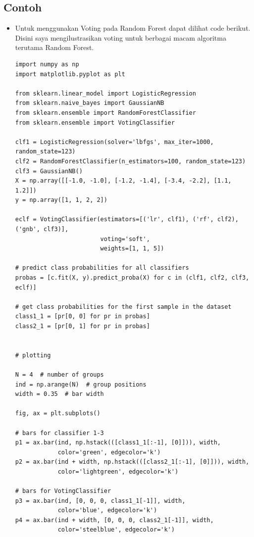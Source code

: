 \subsection{Contoh}
\begin{itemize}
\item
Untuk menggunakan Voting pada Random Forest dapat dilihat code berikut. Disini saya mengilustrasikan voting untuk berbagai macam algoritma terutama Random Forest.
\begin{verbatim}
import numpy as np
import matplotlib.pyplot as plt

from sklearn.linear_model import LogisticRegression
from sklearn.naive_bayes import GaussianNB
from sklearn.ensemble import RandomForestClassifier
from sklearn.ensemble import VotingClassifier

clf1 = LogisticRegression(solver='lbfgs', max_iter=1000, random_state=123)
clf2 = RandomForestClassifier(n_estimators=100, random_state=123)
clf3 = GaussianNB()
X = np.array([[-1.0, -1.0], [-1.2, -1.4], [-3.4, -2.2], [1.1, 1.2]])
y = np.array([1, 1, 2, 2])

eclf = VotingClassifier(estimators=[('lr', clf1), ('rf', clf2), ('gnb', clf3)],
                        voting='soft',
                        weights=[1, 1, 5])

# predict class probabilities for all classifiers
probas = [c.fit(X, y).predict_proba(X) for c in (clf1, clf2, clf3, eclf)]

# get class probabilities for the first sample in the dataset
class1_1 = [pr[0, 0] for pr in probas]
class2_1 = [pr[0, 1] for pr in probas]


# plotting

N = 4  # number of groups
ind = np.arange(N)  # group positions
width = 0.35  # bar width

fig, ax = plt.subplots()

# bars for classifier 1-3
p1 = ax.bar(ind, np.hstack(([class1_1[:-1], [0]])), width,
            color='green', edgecolor='k')
p2 = ax.bar(ind + width, np.hstack(([class2_1[:-1], [0]])), width,
            color='lightgreen', edgecolor='k')

# bars for VotingClassifier
p3 = ax.bar(ind, [0, 0, 0, class1_1[-1]], width,
            color='blue', edgecolor='k')
p4 = ax.bar(ind + width, [0, 0, 0, class2_1[-1]], width,
            color='steelblue', edgecolor='k')


\end{verbatim}
\end{itemize}
